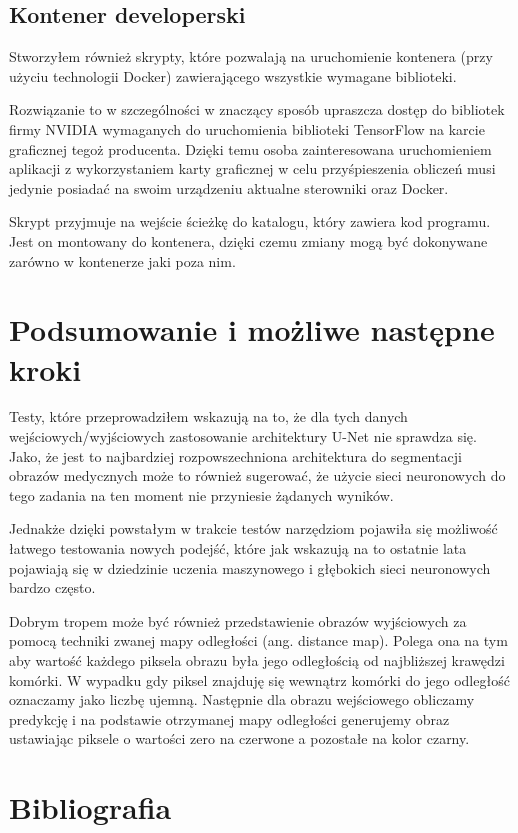 \documentclass{article}
\begin{document}
\subsection{Kontener developerski}
Stworzyłem również skrypty, które pozwalają na uruchomienie kontenera (przy użyciu technologii Docker) zawierającego wszystkie wymagane biblioteki.

Rozwiązanie to w szczególności w znaczący sposób upraszcza dostęp do bibliotek firmy NVIDIA wymaganych do uruchomienia biblioteki TensorFlow na karcie graficznej tegoż producenta.
Dzięki temu osoba zainteresowana uruchomieniem aplikacji z wykorzystaniem karty graficznej w celu przyśpieszenia obliczeń musi jedynie posiadać na swoim urządzeniu aktualne sterowniki oraz Docker.

Skrypt przyjmuje na wejście ścieżkę do katalogu, który zawiera kod programu.
Jest on montowany do kontenera, dzięki czemu zmiany mogą być dokonywane zarówno w kontenerze jaki poza nim.
\newpage
\section{Podsumowanie i możliwe następne kroki}
Testy, które przeprowadziłem wskazują na to, że dla tych danych wejściowych/wyjściowych zastosowanie architektury U-Net nie sprawdza się.
Jako, że jest to najbardziej rozpowszechniona architektura do segmentacji obrazów medycznych może to również sugerować, że użycie sieci neuronowych do tego zadania na ten moment nie przyniesie żądanych wyników.

Jednakże dzięki powstałym w trakcie testów narzędziom pojawiła się możliwość łatwego testowania nowych podejść, które jak wskazują na to ostatnie lata pojawiają się w dziedzinie uczenia maszynowego i głębokich sieci neuronowych bardzo często.

Dobrym tropem może być również przedstawienie obrazów wyjściowych za pomocą techniki zwanej mapy odległości (ang. distance map).
Polega ona na tym aby wartość każdego piksela obrazu była
jego odległością od najbliższej krawędzi komórki.
W wypadku gdy piksel znajduję się wewnątrz komórki do jego odległość oznaczamy jako liczbę ujemną. Następnie dla obrazu wejściowego obliczamy predykcję i na podstawie otrzymanej mapy odległości generujemy obraz ustawiając piksele o wartości zero na czerwone a pozostałe na kolor czarny.
\newpage
\section{Bibliografia}
{}

\end{document}
